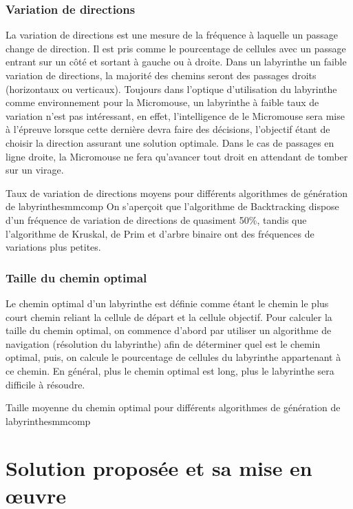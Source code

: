 \subsubsection{Variation de directions}
La variation de directions est une mesure de la fréquence à laquelle un passage change de direction. Il est pris comme le pourcentage de cellules avec un passage entrant sur un côté et sortant à gauche ou à droite.
Dans un labyrinthe un faible variation de directions, la majorité des chemins seront des passages droits (horizontaux ou verticaux). Toujours dans l'optique d'utilisation du labyrinthe comme environnement pour la Micromouse, un labyrinthe à faible taux de variation n'est pas intéressant, en effet, l'intelligence de le Micromouse sera mise à l'épreuve lorsque cette dernière devra faire des décisions, l'objectif étant de choisir la direction assurant une solution optimale. Dans le cas de passages en ligne droite, la Micromouse ne fera qu'avancer tout droit en attendant de tomber sur un virage.


{Taux de variation de directions moyens pour différents algorithmes de génération de labyrinthes}{mmcomp}
On s'aperçoit que l'algorithme de Backtracking dispose d'un fréquence de variation de directions de quasiment 50\%, tandis que l'algorithme de Kruskal, de Prim et d'arbre binaire ont des fréquences de variations plus petites.
\subsubsection{Taille du chemin optimal}
Le chemin optimal d'un labyrinthe est définie comme étant le chemin le plus court chemin reliant la cellule de départ et la cellule objectif. Pour calculer la taille du chemin optimal, on commence d'abord par utiliser un algorithme de navigation (résolution du labyrinthe) afin de déterminer quel est le chemin optimal, puis, on calcule le pourcentage de cellules du labyrinthe appartenant à ce chemin.
En général, plus le chemin optimal est long, plus le labyrinthe sera difficile à résoudre.

{Taille moyenne du chemin optimal pour différents algorithmes de génération de labyrinthes}{mmcomp}



\section{Solution proposée et sa mise en œuvre} \label{sec:solution2}
